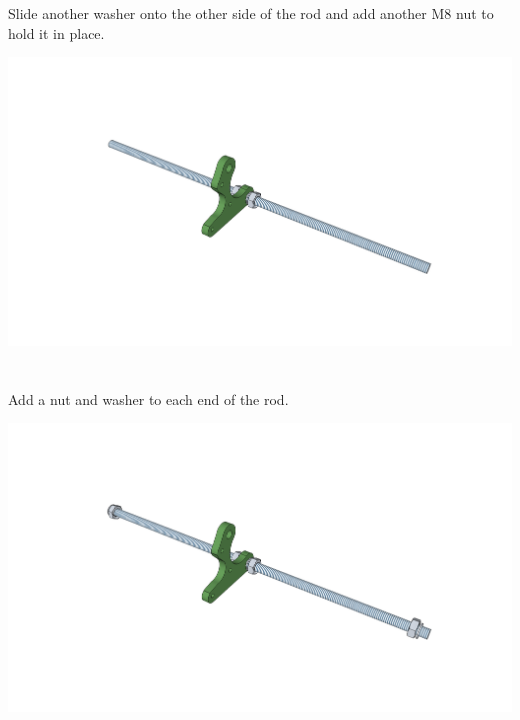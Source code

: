 \documentclass[twoside,openany,a4paper,titlepage]{memoir}
\begin{document}
	\section{}
	Slide another washer onto the other side of the rod and add another M8 nut to hold it in place.\\
	\begin{center}
		\includegraphics[width=1\linewidth]{graphics/ch2_3.png}
	\end{center}
	
	\section{}
	Add a nut and washer to each end of the rod.\\
	\begin{center}
		\includegraphics[width=1\linewidth]{graphics/ch2_4.png}
	\end{center}
	
\end{document}
